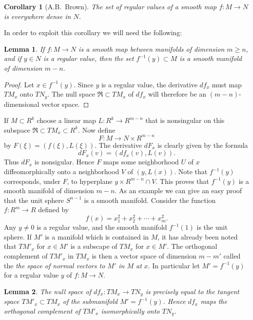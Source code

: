 \documentclass[12pt, openany, closeany]{book}
\newtheorem{lemma}{Lemma}
\theoremstyle{corollary}
\newtheorem*{corollary}{Corollary}
\begin{document}
  \begin{corollary}[A.B.\ Brown]
	  The set of regular values of a smooth map $f: M\to N$ is everywhere dense in $N$.
  \end{corollary}

  In order to exploit this corollary we will need the following:

  \begin{lemma}
	  If $f: M \to N$ is a smooth map between manifolds of dimension $m\geq n$, and if $y\in N$ is a regular value, then the set $f^{-1}(y) \subset M$ is a smooth manifold of dimension $m - n$.
  \end{lemma}

  \begin{proof}
	  Let $x\in f^{-1}(y)$. Since $y$ is a regular value, the derivative $df_{x}$ must map $TM_{x}$ onto $TN_{y}$. The null space $\Re \subset TM_{x}$ of $df_{x}$ will therefore be an $(m - n)$-dimensional vector space.
  \end{proof} 

    If $M \subset R^{k}$ choose a linear map $L : R^k \to R^{m-n}$ that is nonsingular on this subspace $\Re \subset TM_{x} \subset R^k$. Now define
    \[
	    F : M \to N \times R^{m-n}
    \]
    by $F(\xi) = (f(\xi), L(\xi))$. The derivative $dF_{x}$ is clearly given by the formula
    \[
	    dF_{x}(v) = (df_{x}(v), L(v)).
    \]
    Thus $dF_{x}$ is nonsigular. Hence $F$ maps some neighborhood $U$ of $x$ diffeomorphically onto a neighborhood $V$ of $(y, L(x))$. Note that $f^{-1}(y)$ corresponds, under $F$, to hyperplane $y \times R^{m-n}\cap V$. This proves that $f^{-1}(y)$ is a smooth manifold of dimension $m - n$. 
    As an example we can give an easy proof that the unit sphere $S^{n-1}$ is a smooth manifold. Consider the function $f : R^m \to R$ defined by
    \[
	     f(x) = x^2_{1} + x^2_{2} + \cdots + x^2_{m}.
     \]
    Any $y \neq 0$ is a regular value, and the smooth manifold $f^{-1}(1)$ is the unit sphere.
    If $M'$ is a manifold which is contained in $M$, it has already been noted that $TM'_{x}$ for $x\in M'$ is a subscape of $TM_{x}$ for $x\in M'$. The orthogonal complement of $TM'_{x}$ in $TM_{x}$ is then a vector space of dimension $m - m'$ called the \emph{the space of normal vectors to $M'$ in $M$ at} $x$.
    In particular let $M' = f^{-1}(y)$ for a regular value $y$ of $f: M \to N$.

  \begin{lemma}
	  The null space of $df_{x} : TM_{x} \to TN_{y}$ is precisely equal to the tangent space $TM'_{x} \subset TM_{x}$ of the submanifold $M' = f^{-1}(y)$. Hence $df_{x}$ maps the orthogonal complement of $TM'_{x}$ isomorphically onto $TN_{y}$.
  \end{lemma}
\end{document}

